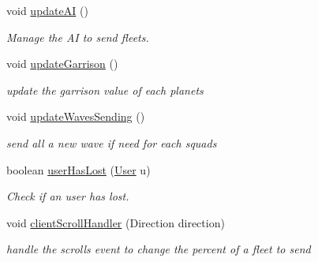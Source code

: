\begin{DoxyCompactItemize}
\mbox{\label{classfr_1_1groupe40_1_1projet_1_1model_1_1board_1_1_galaxy_a32edba917f025f3ed2ff6d4723401dd1}} 
void \hyperlink{classfr_1_1groupe40_1_1projet_1_1model_1_1board_1_1_galaxy_a32edba917f025f3ed2ff6d4723401dd1}{update\+AI} ()
\begin{DoxyCompactList}\small\item\em Manage the AI to send fleets. \end{DoxyCompactList}\item 
\mbox{\label{classfr_1_1groupe40_1_1projet_1_1model_1_1board_1_1_galaxy_abad9a09b0c05e9092229a7406c8e1978}} 
void \hyperlink{classfr_1_1groupe40_1_1projet_1_1model_1_1board_1_1_galaxy_abad9a09b0c05e9092229a7406c8e1978}{update\+Garrison} ()
\begin{DoxyCompactList}\small\item\em update the garrison value of each planets \end{DoxyCompactList}\item 
\mbox{\label{classfr_1_1groupe40_1_1projet_1_1model_1_1board_1_1_galaxy_afe5b556d02f5234c44ccfd505de5e2db}} 
void \hyperlink{classfr_1_1groupe40_1_1projet_1_1model_1_1board_1_1_galaxy_afe5b556d02f5234c44ccfd505de5e2db}{update\+Waves\+Sending} ()
\begin{DoxyCompactList}\small\item\em send all a new wave if need for each squads \end{DoxyCompactList}\item 
boolean \hyperlink{classfr_1_1groupe40_1_1projet_1_1model_1_1board_1_1_galaxy_ad3ec27b73e7f093df14ca096395d10c2}{user\+Has\+Lost} (\hyperlink{classfr_1_1groupe40_1_1projet_1_1client_1_1_user}{User} u)
\begin{DoxyCompactList}\small\item\em Check if an user has lost. \end{DoxyCompactList}\item 
void \hyperlink{classfr_1_1groupe40_1_1projet_1_1model_1_1board_1_1_galaxy_a1cfe73fa7265d21c8c58162dd42acf58}{client\+Scroll\+Handler} (Direction direction)
\begin{DoxyCompactList}\small\item\em handle the scrolls event to change the percent of a fleet to send \end{DoxyCompactList}\item 

\end{DoxyCompactItemize}
